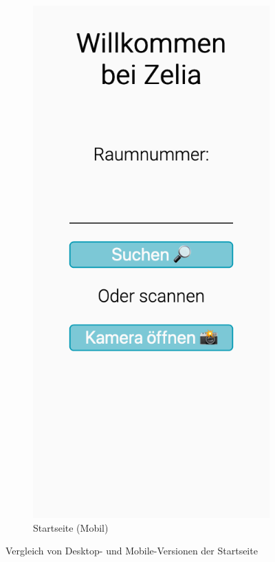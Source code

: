 \begin{figure}[H]
\begin{subfigure}[c]{0.35\textwidth}
        \includegraphics[width=\textwidth]{media/ResponsiveDesign/ZeliaHomeMobile.png}
        \caption{Startseite (Mobil)}
        \label{fig:homeMobile}
    \end{subfigure}
    \caption{Vergleich von Desktop- und Mobile-Versionen der Startseite}
    \label{fig:home}
\end{figure}